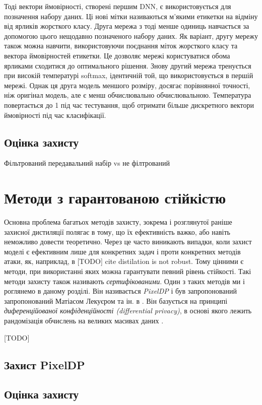 \documentclass[14pt,a4paper]{extarticle}
\newcounter{e}
\numberwithin{equation}{section}
\numberwithin{figure}{section}
\begin{document}
 Тоді вектори ймовірності, створені першим DNN, є
 використовується для позначення набору даних. Ці нові мітки називаються м'якими
 етикетки на відміну від ярликів жорсткого класу. Друга мережа з
 тоді менше одиниць навчається за допомогою цього нещодавно позначеного набору даних.
 Як варіант, другу мережу також можна навчити, використовуючи
 поєднання міток жорсткого класу та вектора ймовірностей
 етикетки. Це дозволяє мережі користуватися обома ярликами
 сходитися до оптимального рішення. Знову другий
 мережа тренується при високій температурі softmax, ідентичній
 той, що використовується в першій мережі. Однак ця друга модель
 меншого розміру, досягає порівнянної точності, ніж оригінал
 модель, але є менш обчислювально обчислювальною. Температура
 повертається до 1 під час тестування, щоб отримати більше дискретного
 вектори ймовірності під час класифікації.
 
 
 \subsection{Оцінка захисту}
 
 Фільтрований передавальний набір vs не філтрований
 
 \newpage
 \thispagestyle{empty}
 \section{Методи з гарантованою стійкістю}
 Основна проблема багатьох методів захисту, зокрема і розглянутої раніше захисної дистиляції полягає в тому, що їх ефективність важко, або навіть неможливо довести теоретично. Через це часто виникають випадки, коли захист моделі є ефективним лише для конкретних задач і проти конкретних методів атаки,
 як, наприклад, в [TODO] cite distilation is not robust. Тому цінними є методи, при використанні яких можна гарантувати певний рівень стійкості. Такі методи захисту також називають \textit{сертифікованими}. Один з таких методів ми і роглянемо в даному розділі. Він називається \textit{PixelDP} і був запропонований  запропонований Матіасом Лекуєром та ін. в \cite{pixeldp}. Він базується на принципі \textit{диференційованої конфіденційності (differential privacy)}, в основі якого лежить рандомізація обчислень на великих масивах даних \cite{differential-privacy}.
 
 [TODO]
 \subsection{Захист PixelDP}
 \subsection{Оцінка захисту}
 
\end{document}
